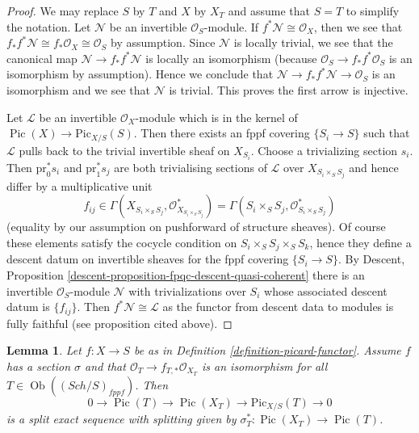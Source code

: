 \documentclass{stacks-project}
\theoremstyle{plain}
\newtheorem{lemma}[subsection]{Lemma}
\theoremstyle{definition}
\theoremstyle{remark}
\numberwithin{equation}{subsection}
\def\Sch{\mathit{Sch}}
\def\Ob{\mathop{\mathrm{Ob}}\nolimits}
\def\Pic{\mathop{\mathrm{Pic}}\nolimits}
\def\Picardfunctor{\mathrm{Pic}}
\begin{document}
\begin{proof}
We may replace $S$ by $T$ and $X$ by $X_T$ and assume that $S = T$
to simplify the notation. Let $\mathcal{N}$ be an invertible
$\mathcal{O}_S$-module. If $f^*\mathcal{N} \cong \mathcal{O}_X$, then
we see that $f_*f^*\mathcal{N} \cong f_*\mathcal{O}_X \cong \mathcal{O}_S$
by assumption. Since $\mathcal{N}$ is locally trivial, we see that
the canonical map $\mathcal{N} \to f_*f^*\mathcal{N}$ is locally
an isomorphism (because $\mathcal{O}_S \to f_*f^*\mathcal{O}_S$
is an isomorphism by assumption). Hence we conclude that
$\mathcal{N} \to f_*f^*\mathcal{N} \to \mathcal{O}_S$ is an isomorphism
and we see that $\mathcal{N}$ is trivial. This proves the first arrow
is injective.

\medskip\noindent
Let $\mathcal{L}$ be an invertible $\mathcal{O}_X$-module which is in
the kernel of $\Pic(X) \to \Picardfunctor_{X/S}(S)$. Then there exists
an fppf covering $\{S_i \to S\}$ such that $\mathcal{L}$ pulls back
to the trivial invertible sheaf on $X_{S_i}$. Choose a trivializing
section $s_i$. Then $\text{pr}_0^*s_i$ and $\text{pr}_1^*s_j$ are both
trivialising sections of $\mathcal{L}$ over $X_{S_i \times_S S_j}$
and hence differ by a multiplicative unit
$$
f_{ij} \in
\Gamma(X_{S_i \times_S S_j}, \mathcal{O}_{X_{S_i \times_S S_j}}^*) =
\Gamma(S_i \times_S S_j, \mathcal{O}_{S_i \times_S S_j}^*)
$$
(equality by our assumption on pushforward of structure sheaves).
Of course these elements satisfy the cocycle condition on
$S_i \times_S S_j \times_S S_k$, hence they define a descent datum
on invertible sheaves for the fppf covering $\{S_i \to S\}$.
By Descent, Proposition \ref{descent-proposition-fpqc-descent-quasi-coherent}
there is an invertible $\mathcal{O}_S$-module $\mathcal{N}$
with trivializations over $S_i$ whose associated descent datum is
$\{f_{ij}\}$. Then $f^*\mathcal{N} \cong \mathcal{L}$ as the
functor from descent data to modules is fully faithful (see proposition
cited above).
\end{proof}

\begin{lemma}
\label{lemma-flat-geometrically-connected-fibres-with-section}
Let $f : X \to S$ be as in Definition \ref{definition-picard-functor}.
Assume $f$ has a section $\sigma$ and that
$\mathcal{O}_T \to f_{T, *}\mathcal{O}_{X_T}$ is an isomorphism
for all $T \in \Ob((\Sch/S)_{fppf})$. Then
$$
0 \to \Pic(T) \to \Pic(X_T) \to \Picardfunctor_{X/S}(T) \to 0
$$
is a split exact sequence with splitting given by
$\sigma_T^* : \Pic(X_T) \to \Pic(T)$.
\end{lemma}
\end{document}
